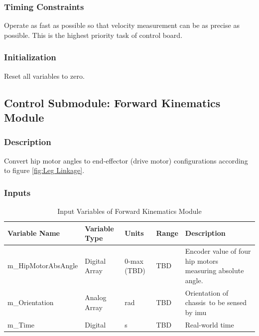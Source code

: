 \documentclass[12pt]{article}
\begin{document}
        \subsubsection{Timing Constraints} \label{sec:Control Module Timing Constraints}
            Operate as fast as possible so that velocity measurement can be as precise as possible. This is the highest priority task of control board.
        \subsubsection{Initialization}
            Reset all variables to zero.

    \subsection{Control Submodule: Forward Kinematics Module}
        \subsubsection{Description}
            Convert hip motor angles to end-effector (drive motor) configurations according to figure \ref{fig:Leg Linkage}.
            
        \subsubsection{Inputs}
            \begin{table}[H]
              \centering
                \caption{Input Variables of Forward Kinematics Module} \label{tbl:Input Variables of Forward Kinematics Module}
              \begin{tabularx}{\textwidth}{|p{5cm}|p{1.2cm}|p{1.2cm}|p{1cm}|X|}
                \hline Variable Name & Variable Type & Units & Range & Description \\
                \hline m\_HipMotorAbsAngle & Digital Array & 0-max (TBD) & TBD & Encoder value of four hip motors\, measuring absolute angle.\\
                \hline m\_Orientation         & Analog Array  & \unit{\radian} & TBD & Orientation of chassis\, to be sensed by \acrshort{imu}\\
                \hline m\_Time & Digital & \unit{\second}  & TBD & Real-world time\\
                \hline
              \end{tabularx}
            \end{table}
            
\end{document}
